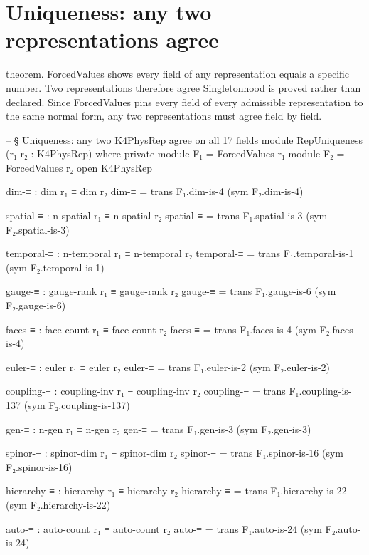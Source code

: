 \documentclass[11pt,a4paper]{book}
\def\texttt#1{#1}%
\begin{document}
\section{Uniqueness: any two representations agree}

theorem.  \texttt{ForcedValues} shows every field of any representation
equals a specific number.  Two representations therefore agree
Singletonhood is proved rather than declared. Since \texttt{ForcedValues} pins every field of every admissible representation to the same normal form, any two representations must agree field by field.

\begin{code}
-- § Uniqueness: any two K4PhysRep agree on all 17 fields
module RepUniqueness (r₁ r₂ : K4PhysRep) where
  private
    module F₁ = ForcedValues r₁
    module F₂ = ForcedValues r₂
  open K4PhysRep

  dim-≡          : dim r₁ ≡ dim r₂
  dim-≡          = trans F₁.dim-is-4 (sym F₂.dim-is-4)

  spatial-≡      : n-spatial r₁ ≡ n-spatial r₂
  spatial-≡      = trans F₁.spatial-is-3 (sym F₂.spatial-is-3)

  temporal-≡     : n-temporal r₁ ≡ n-temporal r₂
  temporal-≡     = trans F₁.temporal-is-1 (sym F₂.temporal-is-1)

  gauge-≡        : gauge-rank r₁ ≡ gauge-rank r₂
  gauge-≡        = trans F₁.gauge-is-6 (sym F₂.gauge-is-6)

  faces-≡        : face-count r₁ ≡ face-count r₂
  faces-≡        = trans F₁.faces-is-4 (sym F₂.faces-is-4)

  euler-≡        : euler r₁ ≡ euler r₂
  euler-≡        = trans F₁.euler-is-2 (sym F₂.euler-is-2)

  coupling-≡     : coupling-inv r₁ ≡ coupling-inv r₂
  coupling-≡     = trans F₁.coupling-is-137 (sym F₂.coupling-is-137)

  gen-≡          : n-gen r₁ ≡ n-gen r₂
  gen-≡          = trans F₁.gen-is-3 (sym F₂.gen-is-3)

  spinor-≡       : spinor-dim r₁ ≡ spinor-dim r₂
  spinor-≡       = trans F₁.spinor-is-16 (sym F₂.spinor-is-16)

  hierarchy-≡    : hierarchy r₁ ≡ hierarchy r₂
  hierarchy-≡    = trans F₁.hierarchy-is-22 (sym F₂.hierarchy-is-22)

  auto-≡         : auto-count r₁ ≡ auto-count r₂
  auto-≡         = trans F₁.auto-is-24 (sym F₂.auto-is-24)


\end{code}
\end{document}
